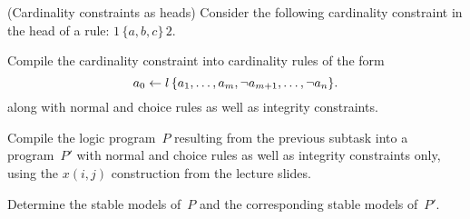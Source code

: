 \begin{Uebung}{(Cardinality constraints as heads)}%
%
Consider the following cardinality constraint in the head of a rule: 
\(
1\,\{a,b,c\}\,2.
\)

\begin{UList}
\item
Compile the cardinality constraint into cardinality rules of the form
\[
a_0\leftarrow l\,\{a_1,\dots,a_m,{\neg{a}}_{m+1},\dots,{\neg{a}}_n\}.
\]
along with normal and choice rules as well as integrity constraints.
\item
Compile the logic program~$P$ resulting from the previous subtask into a
program~$P'$ with normal and choice rules
as well as integrity constraints only,
using the $\mathit{x}(i,j)$ construction from the lecture slides.
\item
Determine the stable models of~$P$ and the corresponding stable models of~$P'$.
\end{UList}
\end{Uebung}

